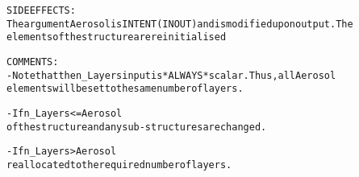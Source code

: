 \begin{alltt}
  SIDE EFFECTS:
        The argument Aerosol is INTENT(IN OUT) and is modified upon output. The
        elements of the structureare reinitialised
 
  COMMENTS:
        - Note that the n_Layers input is *ALWAYS* scalar. Thus, all Aerosol
          elements will be set to the same number of layers.
 
        - If n_Layers <= Aerosol%Max_Layers, then only the dimension value
          of the structure and any sub-structures are changed.
 
        - If n_Layers > Aerosol%Max_Layers, then the entire structure is
          reallocated to the required number of layers.
 
  \end{alltt}
